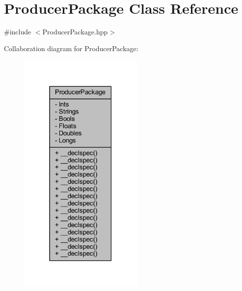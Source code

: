 \hypertarget{class_producer_package}{\section{Producer\-Package Class Reference}
\label{class_producer_package}
}


{\ttfamily \#include $<$Producer\-Package.\-hpp$>$}



Collaboration diagram for Producer\-Package\-:\nopagebreak
\begin{figure}[H]
\begin{center}
\leavevmode
\includegraphics[width=174pt]{class_producer_package__coll__graph}
\end{center}
\end{figure}
